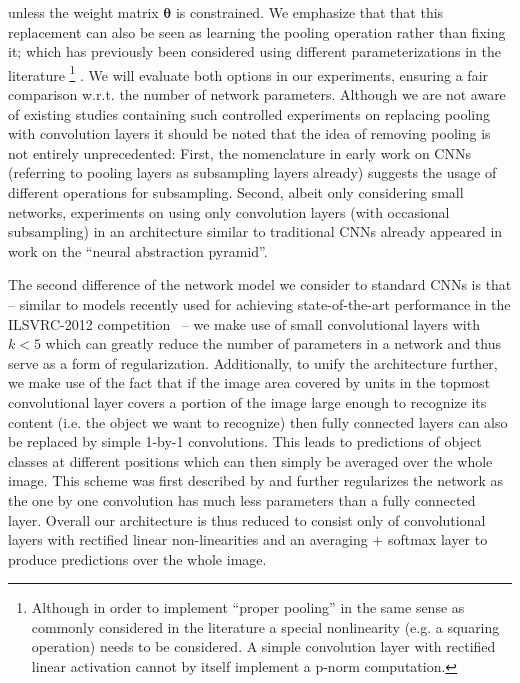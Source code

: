 \documentclass{article} %
\begin{document}
unless the weight matrix 
$\mathbf{\theta}$
is constrained.
We emphasize that that this
replacement can also be seen as 
learning the pooling operation rather than fixing it; which has
previously been considered using different parameterizations in the
literature \footnote{Although in order
  to implement ``proper pooling'' in the same sense as commonly
  considered in the literature a special nonlinearity (e.g. a squaring operation) needs to be
  considered. A simple convolution layer with rectified linear
  activation cannot by itself implement a p-norm computation.}
\citep{LeCun_IEEE1998,Gulcehre_2014,Jia_2012}.
We will evaluate both options in our experiments, ensuring a fair
comparison w.r.t. the number of network parameters. 
Although we are not aware of existing studies   
containing such controlled experiments on replacing pooling with convolution layers
it should be noted that the idea of removing pooling is not entirely unprecedented: 
First, the nomenclature in early work on CNNs \cite{LeCun_IEEE1998} (referring to pooling layers  as 
subsampling layers already) suggests the usage of different operations for subsampling. 
Second, albeit only considering small networks, 
experiments on using only convolution layers (with occasional subsampling) in an architecture similar
to traditional CNNs already appeared in work on the ``neural abstraction pyramid''\cite{Behnke2003}.

The second difference of the network model we consider to standard
CNNs is that -- similar to models recently used for achieving
state-of-the-art performance in the ILSVRC-2012 competition~\citep{VGG_2014,GoingDeep_2014} -- 
we make use of small convolutional layers with $k < 5$ which can
greatly reduce the number of parameters in a network and thus serve as
a form of regularization. 
Additionally, to unify the architecture further, we make use of the
fact that if the image area covered by units in the topmost
convolutional layer covers a portion of the image large enough to
recognize its content (i.e. the object we want to recognize) then
fully connected layers can also be replaced by simple 1-by-1
convolutions. This leads to predictions of object classes at different
positions which can then simply be averaged over the whole image. This
scheme was first described by \citet{Lin_2014} and
further regularizes the network as the one by one convolution has much
less parameters than a fully connected layer.
Overall our architecture is thus reduced to consist only of
convolutional layers with rectified linear non-linearities and an
averaging + softmax layer to produce predictions over the whole image.
\end{document}
